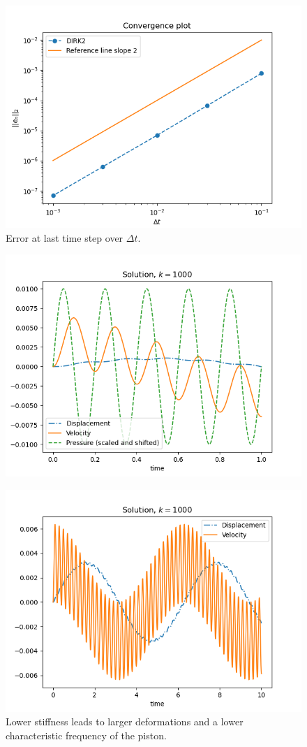 \documentclass[]{article}
\begin{document}
\begin{figure}
	\includegraphics[width=0.9\linewidth]{error.png}
	\caption{\label{sdirk2} Error at last time step over $\Delta t$.}
\end{figure}	
\begin{figure}
	\includegraphics[width=0.9\linewidth]{solution.png}
	\caption{\label{solution}
	}
\end{figure}	
\begin{figure}
	\includegraphics[width=0.9\linewidth]{solutionk100.png}
	\caption{\label{solutionk100} Lower stiffness leads to larger deformations and a lower characteristic frequency of the piston.}
\end{figure}
\end{document}
